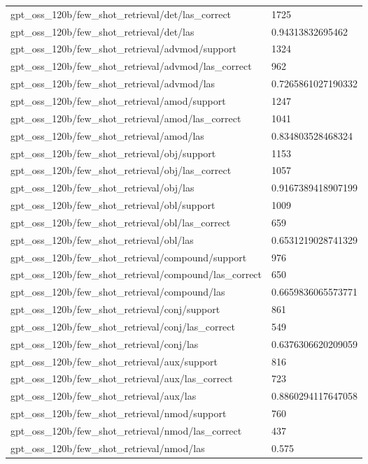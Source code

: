 \begin{tabular}{ll}
gpt\_oss\_120b/few\_shot\_retrieval/det/las\_correct & 1725 \\
gpt\_oss\_120b/few\_shot\_retrieval/det/las & 0.94313832695462 \\
gpt\_oss\_120b/few\_shot\_retrieval/advmod/support & 1324 \\
gpt\_oss\_120b/few\_shot\_retrieval/advmod/las\_correct & 962 \\
gpt\_oss\_120b/few\_shot\_retrieval/advmod/las & 0.7265861027190332 \\
gpt\_oss\_120b/few\_shot\_retrieval/amod/support & 1247 \\
gpt\_oss\_120b/few\_shot\_retrieval/amod/las\_correct & 1041 \\
gpt\_oss\_120b/few\_shot\_retrieval/amod/las & 0.834803528468324 \\
gpt\_oss\_120b/few\_shot\_retrieval/obj/support & 1153 \\
gpt\_oss\_120b/few\_shot\_retrieval/obj/las\_correct & 1057 \\
gpt\_oss\_120b/few\_shot\_retrieval/obj/las & 0.9167389418907199 \\
gpt\_oss\_120b/few\_shot\_retrieval/obl/support & 1009 \\
gpt\_oss\_120b/few\_shot\_retrieval/obl/las\_correct & 659 \\
gpt\_oss\_120b/few\_shot\_retrieval/obl/las & 0.6531219028741329 \\
gpt\_oss\_120b/few\_shot\_retrieval/compound/support & 976 \\
gpt\_oss\_120b/few\_shot\_retrieval/compound/las\_correct & 650 \\
gpt\_oss\_120b/few\_shot\_retrieval/compound/las & 0.6659836065573771 \\
gpt\_oss\_120b/few\_shot\_retrieval/conj/support & 861 \\
gpt\_oss\_120b/few\_shot\_retrieval/conj/las\_correct & 549 \\
gpt\_oss\_120b/few\_shot\_retrieval/conj/las & 0.6376306620209059 \\
gpt\_oss\_120b/few\_shot\_retrieval/aux/support & 816 \\
gpt\_oss\_120b/few\_shot\_retrieval/aux/las\_correct & 723 \\
gpt\_oss\_120b/few\_shot\_retrieval/aux/las & 0.8860294117647058 \\
gpt\_oss\_120b/few\_shot\_retrieval/nmod/support & 760 \\
gpt\_oss\_120b/few\_shot\_retrieval/nmod/las\_correct & 437 \\
gpt\_oss\_120b/few\_shot\_retrieval/nmod/las & 0.575 \\

\end{tabular}

